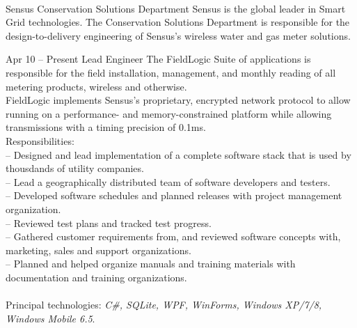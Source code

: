 \documentclass[a4paper, 10pt]{article}
\begin{document}
    \begin{resume}
        \\[2ex]
        \begin{block}
            \begin{category}{Sensus}
                 {Conservation Solutions Department}
                Sensus is the global leader in Smart Grid technologies.  The Conservation Solutions
                Department is responsible for the design-to-delivery engineering of Sensus's wireless
                water and gas meter solutions.
                \bigskip
            \end{category}
            \begin{subcategory}{Apr 10 -- Present}
                 {Lead Engineer}
                The FieldLogic Suite of applications is responsible for the field installation,
                management, and monthly reading of all metering products, wireless and otherwise.
                \\[1ex]
                FieldLogic implements Sensus's proprietary, encrypted network protocol to allow running
                on a performance- and memory-constrained platform while allowing transmissions with a
                timing precision of 0.1ms.
                \\[1ex]
                Responsibilities: \\
                -- Designed and lead implementation of a complete software stack that is used by thousdands of utility companies. \\
                -- Lead a geographically distributed team of software developers and testers. \\
                -- Developed software schedules and planned releases with project management organization. \\
                -- Reviewed test plans and tracked test progress. \\
                -- Gathered customer requirements from, and reviewed software concepts with, marketing, sales and support organizations. \\
                -- Planned and helped organize manuals and training materials with documentation and training organizations. \\
                \\[1ex]
                Principal technologies: \emph{C\#, SQLite, WPF, WinForms, Windows XP/7/8, Windows Mobile 6.5}.
                \bigskip

\end{subcategory}
\end{block}
\end{resume}
\end{document}
